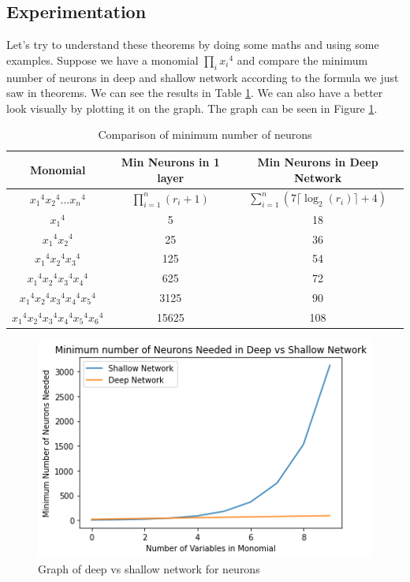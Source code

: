 \documentclass{article}
\begin{document}
\subsection{Experimentation}
Let's try to understand these theorems by doing some maths and using some examples. Suppose we have a monomial $\prod_i{x_i}^4$ and compare the minimum number of neurons in deep and shallow network according to the formula we just saw in theorems. We can see the results in Table \ref{table1}. We can also have a better look visually by plotting it on the graph. The graph can be seen in Figure \ref{fig:figure1}.
\begin{center}
    \begin{table}[H]
        \centering
        \begin{tabular}{|c|c|c|}
        \hline
        Monomial & Min Neurons in 1 layer & Min Neurons in Deep Network \\
        \hline
            ${x_1}^4 {x_2}^4 ... {x_n}^4$ & $\prod\limits_{i=1}^n (r_i + 1)$ & $\sum\limits_{i=1}^n (7 \lceil \log_2 (r_i) \rceil + 4)$\\
        \hline
        ${x_1}^4$ & 5 & 18\\
        \hline
        ${x_1}^4 {x_2}^4$ & 25 & 36\\
        \hline
        ${x_1}^4 {x_2}^4 {x_3}^4$ & 125 & 54\\
        \hline
        ${x_1}^4 {x_2}^4 {x_3}^4 {x_4}^4$ & 625 & 72\\
        \hline
        ${x_1}^4 {x_2}^4 {x_3}^4 {x_4}^4 {x_5}^4$ & 3125 & 90\\
        \hline
        ${x_1}^4 {x_2}^4 {x_3}^4 {x_4}^4 {x_5}^4 {x_6}^4$ & 15625 & 108\\
        \hline
        \end{tabular}
        \caption{Comparison of minimum number of neurons}
        \label{table1}
    \end{table}
    \end{center}
\begin{figure}[H]
    \centering
    \includegraphics[width=0.8 \textwidth]{Images/comparison.jpg}
    \caption{Graph of deep vs shallow network for neurons}
    \label{fig:figure1}
\end{figure}
\end{document}
